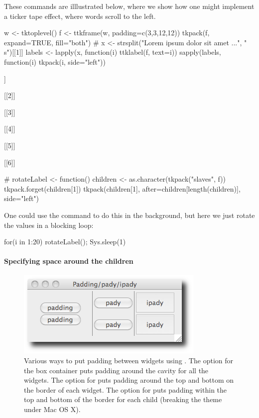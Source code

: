 These commands are illlustrated below, where we show how one might
implement a ticker tape effect, where words scroll to the left.
\begin{Schunk}
\begin{Sinput}
 w <- tktoplevel()
 f <- ttkframe(w, padding=c(3,3,12,12))
 tkpack(f, expand=TRUE, fill="both")
 #
 x <- strsplit("Lorem ipsum dolor sit amet ...", "\\s")[[1]]
 labels <- lapply(x, function(i) ttklabel(f, text=i))
 sapply(labels, function(i) tkpack(i, side="left"))
\end{Sinput}
\begin{Soutput}
[[1]]

[[2]]

[[3]]

[[4]]

[[5]]

[[6]]
\end{Soutput}
\begin{Sinput}
 #
 rotateLabel <- function() {
   children <- as.character(tkpack("slaves", f))
   tkpack.forget(children[1])
   tkpack(children[1], after=children[length(children)], side="left")
 }
\end{Sinput}
\end{Schunk}

One could use the  command to do this in the background,
but here we just rotate the values in a blocking loop:
\begin{Schunk}
\begin{Sinput}
 for(i in 1:20) {rotateLabel(); Sys.sleep(1)}
\end{Sinput}
\end{Schunk}


\paragraph{Specifying space around the children}

\begin{figure}
  \centering
  \includegraphics[width=.6\textwidth]{fig-tcltk-padding-pady-ipady}
 \caption{Various ways to put padding between widgets using . The  option for the box container puts padding around the cavity for all the widgets. The  option for  puts padding around the top and bottom on the border of each widget. The  option for  puts padding within the top and bottom of the border for each child (breaking the theme under Mac OS X).}
  \label{fig:fig-pack-example}
\end{figure}


